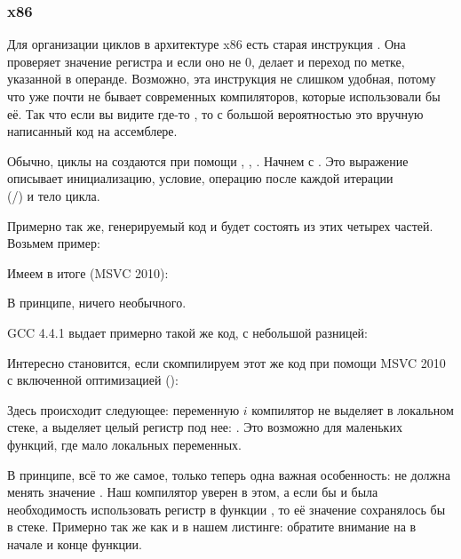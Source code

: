 \subsubsection{x86}

Для организации циклов в архитектуре x86 есть старая инструкция \LOOP. 
Она проверяет значение регистра \ECX и если оно не 0, делает  \ECX 
и переход по метке, указанной в операнде. 
Возможно, эта инструкция не слишком удобная, потому что уже почти не бывает современных компиляторов, 
которые использовали бы её. Так что если вы видите где-то \LOOP, то с большой вероятностью это 
вручную написанный код на ассемблере.

Обычно, циклы на \CCpp создаются при помощи , , .
Начнем с .
Это выражение описывает инициализацию, условие, операцию после каждой итерации\\
(/) и тело цикла.



Примерно так же, генерируемый код и будет состоять из этих четырех частей.
Возьмем пример:



Имеем в итоге (MSVC 2010):



В принципе, ничего необычного.

GCC 4.4.1 выдает примерно такой же код, с небольшой разницей:



Интересно становится, если скомпилируем этот же код при помощи MSVC 2010 с включенной оптимизацией (\TT{\Ox}):



Здесь происходит следующее: переменную $i$ компилятор не выделяет в локальном стеке, 
а выделяет целый регистр под нее: \ESI. 
Это возможно для маленьких функций, где мало локальных переменных.

В принципе, всё то же самое, только теперь одна важная особенность: 
\ttf не должна менять значение \ESI. 
Наш компилятор уверен в этом, а если бы и была необходимость использовать регистр \ESI в функции \ttf, 
то её значение сохранялось бы в стеке. Примерно так же как и в нашем листинге: 
обратите внимание на  в начале и конце функции.

